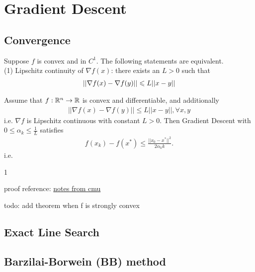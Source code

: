 \chapter{Gradient Descent}\label{chp:gradient descent}


\section{Convergence}
\begin{proposition}
    Suppose $f$ is convex and in $C^1$. The following statements are equivalent.\\
    (1) Lipschitz continuity of $\nabla f(x)$: there exists an $L>0$ such that
    \begin{align*}
        ||\nabla f(x)-\nabla f(y)||\leqslant L||x-y||
    \end{align*}
\end{proposition}


\begin{theorem}{}{}
    Assume that $f : \mathbb{R}^n \rightarrow \mathbb{R}$ is convex and differentiable, and additionally
    \begin{align*}
        ||\nabla f(x)-\nabla f(y)||\leq L||x-y||,\forall x,y
    \end{align*}
    i.e. $\nabla f$ is Lipschitz continuous with constant $L>0$. Then Gradient Descent with $0\leq \alpha_k\leq \frac{1}{L}$ satisfies
    \begin{align*}
        f(x_k)-f(x^*)\leq \frac{||x_0-x^*||^2}{2\alpha_k k}.
    \end{align*}
    i.e. 
\end{theorem}

\begin{proofsolution}
    1
\end{proofsolution}



\begin{remark}
    proof reference: \href{https://www.cs.cmu.edu/~ggordon/10725-F12/scribes/10725_Lecture5.pdf}{notes from cmu}
\end{remark}

todo: add theorem when f is strongly convex

\section{Exact Line Search}

\section{Barzilai-Borwein (BB) method}


